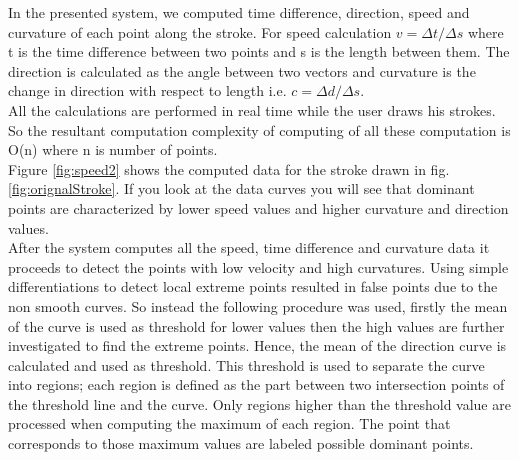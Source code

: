 \documentclass[a4paper,10pt]{IEEEconf}
\begin{document}
 In the presented system, we computed time difference, direction, speed and curvature of each point along the stroke. For speed calculation $v=\Delta t/\Delta s$ where t is the time difference between two points and s is the length between them. The direction is calculated as the angle between two vectors and curvature is the change in direction with respect to length i.e. $c= \Delta d/\Delta s$. \\
 All the calculations are performed in real time while the user draws his strokes.
 So the resultant computation complexity of computing of all these computation is O(n) where n is number of points. \\
 Figure \ref{fig:speed2} shows the computed data for the stroke drawn in fig. \ref{fig:orignalStroke}.  If you look at the data curves you will see that dominant points are characterized by lower speed values and higher curvature and direction values. \\%
After the system computes all the speed, time difference and curvature data it proceeds to detect the points with low velocity and high curvatures. Using simple differentiations to detect local extreme points resulted in false points due to the non smooth curves. So instead the following procedure was used, firstly the mean of the curve is used as threshold for lower values then the high values are further investigated to find the extreme points. Hence, the mean of the direction curve is calculated and used as threshold. This threshold is used to separate the curve into regions; each region is defined as the part between two intersection points of the threshold line and the curve. Only regions higher than the threshold value are processed when computing the maximum of each region. The point that corresponds to those maximum values are labeled possible dominant points.   \\
\end{document}
